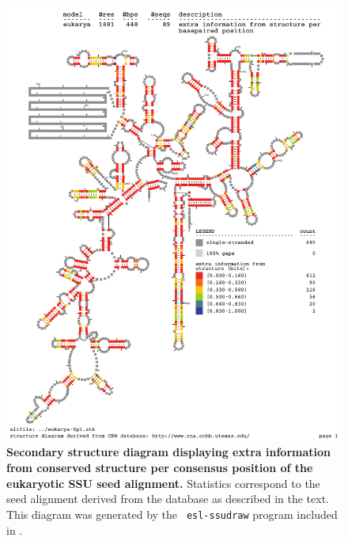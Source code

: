 \begin{figure}
\begin{center}
\includegraphics[width=5.5in]{../../seeds/ss-diagrams/eukarya-0p1-struct}
\end{center}
\caption[Secondary structure diagram displaying extra information 
  from conserved structure per consensus position of the eukaryotic SSU seed
  alignment]{\textbf{Secondary structure diagram displaying extra
  information from conserved structure per consensus position of the eukaryotic SSU seed
  alignment.} Statistics correspond to the  seed
  alignment derived from the  database \cite{CannoneGutell02}
  as described in the text. This diagram was generated by the {\tt
  esl-ssudraw} program included in .}
\label{fig:euksinfo}
\end{figure}


